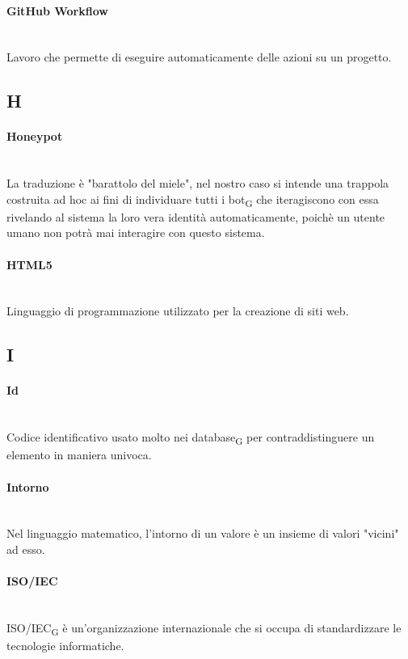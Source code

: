 \paragraph{GitHub Workflow}~\smallskip \\
Lavoro che permette di eseguire automaticamente delle azioni su un progetto.
\newpage
{}
\subsection*{H}
\paragraph{Honeypot}~\smallskip \\
La traduzione è "barattolo del miele", nel nostro caso si intende una trappola costruita ad hoc ai fini di individuare tutti i bot\textsubscript{G} che iteragiscono con essa rivelando al sistema la loro vera identità automaticamente, poichè un utente umano non potrà mai interagire con questo sistema.

\paragraph{HTML5}~\smallskip \\
Linguaggio di programmazione utilizzato per la creazione di siti web.
\newpage
{}
\subsection*{I}
\paragraph{Id}~\smallskip \\
Codice identificativo usato molto nei database\textsubscript{G} per contraddistinguere un elemento in maniera univoca.

\paragraph{Intorno}~\smallskip \\
Nel linguaggio matematico, l'intorno di un valore è un insieme di valori "vicini" ad esso.

\paragraph{ISO/IEC}~\smallskip \\
ISO/IEC\textsubscript{G} è un'organizzazione internazionale che si occupa di standardizzare le tecnologie informatiche.

